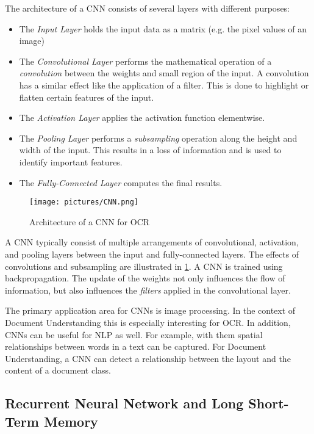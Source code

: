 The architecture of a \ac{CNN} consists of several layers with different purposes:
\begin{itemize}
    \item The \textit{Input Layer} holds the input data as a matrix (e.g. the pixel values of an image)
    \item The \textit{Convolutional Layer} performs the mathematical operation of a \textit{convolution} between the weights and small region of the input. A convolution has a similar effect like the application of a filter. This is done to highlight or flatten certain features of the input.
    \item The \textit{Activation Layer} applies the activation function elementwise.
    \item The \textit{Pooling Layer} performs a \textit{subsampling} operation along the height and width of the input. This results in a loss of information and is used to identify important features.
    \item The \textit{Fully-Connected Layer} computes the final results.
\end{itemize}
\begin{figure}[ht]
    \centering 
    \texttt{[image: pictures/CNN.png]}
    \caption{Architecture of a CNN for OCR \cite{lecun1998gradient}}
    \label{pic:CNN}    %
\end{figure}

A \ac{CNN} typically consist of multiple arrangements of convolutional, activation, and pooling layers between the input and fully-connected layers. The effects of convolutions and subsampling are illustrated in \cref{pic:CNN}. A \ac{CNN} is trained using backpropagation. The update of the weights not only influences the flow of information, but also influences the \textit{filters} applied in the convolutional layer.
\cite{fukushima1980neocognitron,lecun1998gradient,Goodfellow-et-al-2016}

The primary application area for \acp{CNN} is image processing. In the context of Document Understanding this is especially interesting for \ac{OCR}.
In addition, \acp{CNN} can be useful for \ac{NLP} as well. For example, with them spatial relationships between words in a text can be captured. For Document Understanding, a \ac{CNN} can detect a relationship between the layout and the content of a document class.
\cite{lecun1998gradient,leiAI}

\subsection{Recurrent Neural Network and Long Short-Term Memory}

